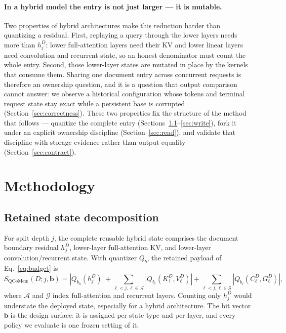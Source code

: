 \documentclass{article}
\begin{document}
\paragraph{In a hybrid model the entry is not just larger --- it is mutable.}
Two properties of hybrid architectures make this reduction harder than
quantizing a residual.  First, replaying a query through the lower layers needs
more than $h_j^D$: lower full-attention layers need their KV and lower linear
layers need convolution and recurrent state, so an honest denominator must count
the whole entry.  Second, those lower-layer states are mutated in place by the
kernels that consume them.  Sharing one document entry across concurrent
requests is therefore an ownership question, and it is a question that output
comparison cannot answer: we observe a historical configuration whose tokens and
terminal request state stay exact while a persistent base is corrupted
(Section~\ref{sec:correctness}).  These two properties fix the structure of the
method that follows --- quantize the complete entry
(Sections~\ref{sec:decomposition}--\ref{sec:write}), fork it under an explicit
ownership discipline (Section~\ref{sec:read}), and validate that discipline with
storage evidence rather than output equality (Section~\ref{sec:contract}).

\section{Methodology}
\label{sec:method}

\subsection{Retained state decomposition}
\label{sec:decomposition}

For split depth $j$, the complete reusable hybrid state comprises the document
boundary residual $h_j^D$, lower-layer full-attention KV, and lower-layer
convolution/recurrent state.  With quantizer $Q_b$, the retained payload of
Eq.~\ref{eq:budget} is
\begin{equation}
 S_{\mathrm{QCoMem}}(D;j,\mathbf b)=|Q_{b_h}(h_j^D)|+
 \sum_{\ell<j,\ell\in\mathcal A}|Q_{b_\ell}(K^D_\ell,V^D_\ell)|+
 \sum_{\ell<j,\ell\in\mathcal G}|Q_{b_\ell}(C^D_\ell,G^D_\ell)|,
\end{equation}
where $\mathcal A$ and $\mathcal G$ index full-attention and recurrent layers.
Counting only $h_j^D$ would understate the deployed state, especially for a
hybrid architecture.  The bit vector $\mathbf b$ is the design surface: it is
assigned per state type and per layer, and every policy we evaluate is one
frozen setting of it.
\end{document}
